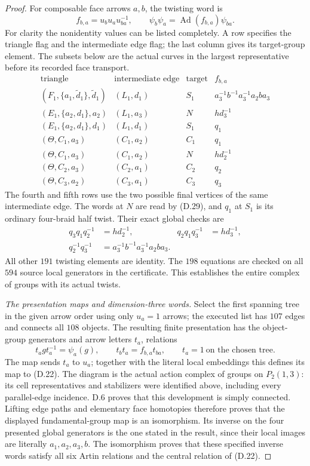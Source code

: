 \begin{proof}
For composable face arrows $a,b$, the twisting word is
\[
                    f_{b,a}=u_bu_a u_{ba}^{-1},\qquad
             \psi_b\psi_a=\operatorname{Ad}(f_{b,a})\psi_{ba}.
\]
For clarity the nonidentity
values can be listed completely.  A row specifies the
triangle flag and the intermediate edge flag; the
last column gives its target-group element.  The
subsets below are the actual curves in
the largest representative before its recorded face
transport.
\[
\begin{array}{c|c|c|c}
\text{triangle}&\text{intermediate edge}&\text{target}&f_{b,a}\\\hline
(F_1,\{a_1,\widetilde d_1\},\widetilde d_1)
 &(L_1,d_1)&S_1&a_3^{-1}b^{-1}a_3^{-1}a_2ba_3\\
(E_1,\{a_2,d_1\},a_2)&(L_1,a_3)&N&h d_3^{-1}\\
(E_1,\{a_2,d_1\},d_1)&(L_1,d_1)&S_1&q_1\\
(\Theta,C_1,a_3)&(C_1,a_2)&C_1&q_1\\
(\Theta,C_1,a_3)&(C_1,a_2)&N&h d_2^{-1}\\
(\Theta,C_2,a_3)&(C_2,a_1)&C_2&q_2\\
(\Theta,C_3,a_2)&(C_3,a_1)&C_3&q_3
\end{array}                                                     \tag{D.32}
\]
The fourth and fifth rows use the two possible final
vertices of the same intermediate edge.  The words
at $N$ are read by (D.29), and $q_1$ at $S_1$ is its
ordinary four-braid half twist.  Their exact global
checks are
\[
\begin{aligned}
 q_3q_1q_2^{-1}&=h d_2^{-1},&
 q_2q_1q_3^{-1}&=h d_3^{-1},\\
 q_2^{-1}q_3^{-1}&=a_3^{-1}b^{-1}a_3^{-1}a_2ba_3.&&
\end{aligned}
\]
All other $191$ twisting elements are identity.
The $198$ equations are checked on all $594$ source
local generators in the certificate.  This establishes
the entire complex of groups with its actual twists.

\emph{The presentation maps and dimension-three words.}
Select the first spanning tree in the given arrow order
using only $u_a=1$ arrows; the executed list has $107$
edges and connects all $108$ objects.  The resulting
finite presentation has the object-group generators
and arrow letters $t_a$, relations
\[
 t_a g t_a^{-1}=\psi_a(g),\qquad
 t_b t_a=f_{b,a}t_{ba},\qquad
 t_a=1\ \text{on the chosen tree}.
\]
The map sends $t_a$ to $u_a$; together with the literal
local embeddings this defines its map to (D.22).  The diagram is the
actual action complex of groups on $P_2(1,3)$: its
cell representatives and stabilizers were identified
above, including every parallel-edge incidence.
D.6 proves that this development is simply connected.
Lifting edge paths and elementary face homotopies
therefore proves that the displayed fundamental-group
map is an isomorphism.  Its inverse on the four
presented global generators is the one stated in the
result, since their local images are literally
$a_1,a_2,a_3,b$.  The isomorphism proves that these
specified inverse words satisfy all six Artin
relations and the central relation of (D.22).


\end{proof}
